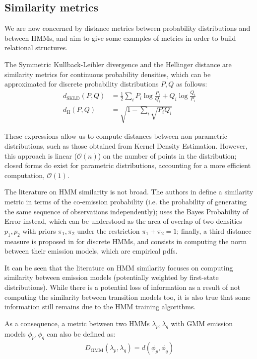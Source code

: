 \documentclass[pdftex,11pt,a4paper]{article}
\theoremstyle{definition}
\theoremstyle{remark}
\begin{document}
\subsection{Similarity metrics}
We are now concerned by distance metrics between probability distributions and between HMMs, and aim to give some examples of metrics in order to build relational structures.
\par The Symmetric Kullback-Leibler divergence and the Hellinger distance are similarity metrics for continuous probability densities, which can be approximated for discrete probability distributions $P, Q$ as follows:
\begin{align*}
d_{\text{SKLD}}(P, Q) &= \frac{1}{2}\sum_iP_i\log{\frac{P_i}{Q_i}} + Q_i\log{\frac{Q_i}{P_i}}\\
d_{\text{H}}(P, Q) &= \sqrt{1 - \sum_i \sqrt{P_iQ_i}}
\end{align*}
\par These expressions allow us to compute distances between non-parametric distributions, such as those obtained from Kernel Density Estimation. However, this approach is linear ($\mathcal{O}(n)$) on the number of points in the distribution; closed forms do exist for parametric distributions, accounting for a more efficient computation, $\mathcal{O}(1)$. 
\par The literature on HMM similarity is not broad. The authors in \cite{Lyngs1999} define a similarity metric in terms of the co-emission probability (i.e. the probability of generating the same sequence of observations independently); \cite{Bahlmann2001} uses the Bayes Probability of Error instead, which can be understood as the area of overlap of two densities $p_1, p_2$ with priors $\pi_1, \pi_2$ under the restriction $\pi_1+\pi_2 = 1$; finally, a third distance measure is proposed in \cite{Juang1985} for discrete HMMs, and consists in computing the norm between their emission models, which are empirical pdfs.
\par It can be seen that the literature on HMM similarity focuses on computing similarity between emission models (potentially weighted by first-state distributions). While there is a potential loss of information as a result of not computing the similarity between transition models too, it is also true that some information still remains due to the HMM training algorithms. 
\par As a consequence, a metric between two HMMs $\lambda_p, \lambda_q$ with GMM emission models $\phi_p, \phi_q$ can also be defined as:
\begin{align*}
D_{\text{GMM}}(\lambda_p, \lambda_q) = d( \phi_p, \phi_q )
\end{align*}
\end{document}
